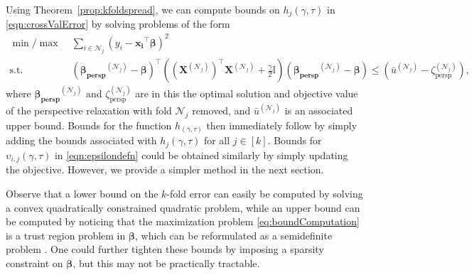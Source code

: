 \documentclass[mnsc,nonblindrev]{informs3} %
\newcommand{\ag}[1]{{\color{black}#1}}
\begin{document}
\ag{Using Theorem~\ref{prop:kfoldspread}, we can compute bounds on $h_j(\gamma,\tau)$ in \eqref{eqn:crossValError} by solving problems of the form 
\begin{subequations}\label{eq:boundComputation}
\begin{align}
\min/\max\;&\sum_{i\in \mathcal{N}_j} \left(y_i -\bm{x_i}^\top \bm{\beta}\right)^2\\
\text{s.t.}\;&(\bm{\beta_{\text{persp}}}^{(\mathcal{N}_j)}- \bm{\beta})^\top \left((\bm{X}^{(\mathcal{N}_j)})^\top \bm{X}^{(\mathcal{N}_j)}+\frac{\gamma}{2} \bm{\mathbb{I}}\right) (\bm{\beta_{\text{persp}}}^{(\mathcal{N}_j)}- \bm{\beta}) \leq (\bar u^{(\mathcal{N}_j)}-\zeta_{\text{persp}}^{(\mathcal{N}_j)}),
\end{align}
\end{subequations}
where $\bm{\beta_{\text{persp}}}^{(\mathcal{N}_j)}$ and $\zeta_{\text{persp}}^{(\mathcal{N}_j)}$ are in this the optimal solution and objective value of the perspective relaxation with fold $\mathcal{N}_j$ removed, and $\bar u^{(\mathcal{N}_j)}$ is an associated upper bound. Bounds for the function $h_(\gamma,\tau)$ then immediately follow by simply adding the bounds associated with $h_j(\gamma,\tau)$ for all $j\in [k]$. Bounds for $\upsilon_{i,j}(\gamma,\tau)$ in \eqref{eqn:epsilondefn} could be obtained similarly by simply updating the objective. However, we provide a simpler method in the next section.
}

\begin{remark}[Computability of \ag{the} bounds]\label{rem:computability}
	Observe that a lower bound on the $k$-fold error can easily be computed by solving a convex quadratically constrained quadratic problem, while an upper bound can be computed by noticing that the maximization problem \eqref{eq:boundComputation} is a trust region problem in $\bm{\beta}$, which can be reformulated as a semidefinite problem \citep{hazan2016linear}. One could further tighten these bounds by imposing a sparsity constraint on $\bm{\beta}$, but this may not be practically tractable.
\end{remark}

\end{document}
